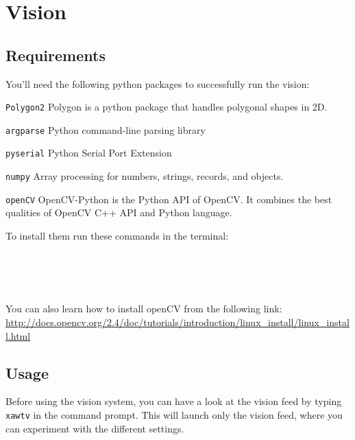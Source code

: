 \section{Vision}

\subsection{Requirements}
You'll need the following python packages to successfully run the vision:

\begin{description}
\item \texttt{Polygon2} Polygon is a python package that handles polygonal shapes in 2D. 
\item \texttt{argparse} Python command-line parsing library
\item \texttt{pyserial} Python Serial Port Extension
\item \texttt{numpy} Array processing for numbers, strings, records, and objects.
\item \texttt{openCV} OpenCV-Python is the Python API of OpenCV. It combines the best qualities of OpenCV C++ API and Python language.
\end{description}

To install them run these commands in the terminal:

 \\
 \\
 \\

You can also learn how to install openCV from the following link:
\url{http://docs.opencv.org/2.4/doc/tutorials/introduction/linux_install/linux_install.html}

\subsection{Usage}
Before using the vision system, you can have a look at the vision feed by typing \texttt{xawtv} in the command prompt. This will launch only the vision feed, where you can experiment with the different settings.

